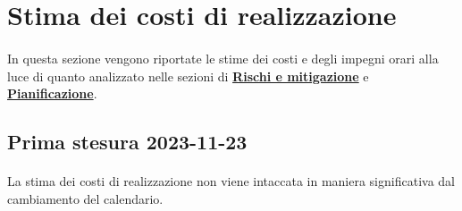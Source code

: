 \documentclass[10pt, a4paper]{article}
\begin{document}
\section{Stima dei costi di realizzazione}
\paragraph{}In questa sezione vengono riportate le stime dei costi e degli impegni orari alla luce di quanto analizzato nelle sezioni di \hyperref[section:Rischi]{\textbf{Rischi e mitigazione}} e \hyperref[section:Pianificazione]{\textbf{Pianificazione}}.

\subsection{Prima stesura 2023-11-23}
\paragraph{}La stima dei costi di realizzazione non viene intaccata in maniera significativa dal cambiamento del calendario.
\end{document}
